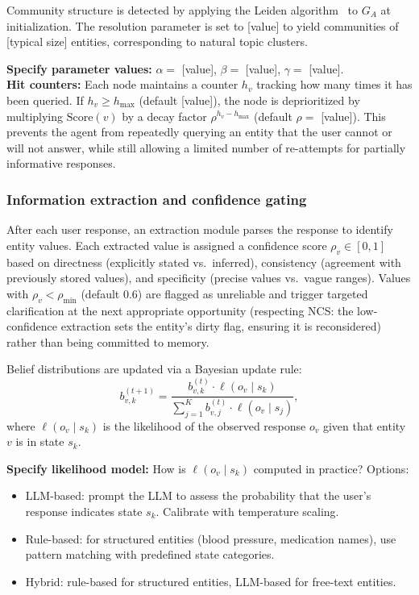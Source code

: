 \documentclass[11pt,a4paper]{article}
\newcommand{\placeholder}[1]{%
  \begin{tcolorbox}[colback=yellow!10,colframe=orange!60!black,
    fonttitle=\bfseries,title=Placeholder]
    #1
  \end{tcolorbox}%
}
\begin{document}
Community structure is detected by applying the Leiden
algorithm~\cite{traag2019leiden} to $G_A$ at initialization. The resolution
parameter is set to [value] to yield communities of [typical size] entities,
corresponding to natural topic clusters.

\placeholder{%
  \textbf{Specify parameter values:}
  $\alpha = $ [value], $\beta = $ [value], $\gamma = $ [value].\\
  \textbf{Hit counters:} Each node maintains a counter $h_v$ tracking how
  many times it has been queried. If $h_v \geq h_{\max}$ (default [value]),
  the node is deprioritized by multiplying $\mathrm{Score}(v)$ by a decay
  factor $\rho^{h_v - h_{\max}}$ (default $\rho = $ [value]). This prevents
  the agent from repeatedly querying an entity that the user cannot or will
  not answer, while still allowing a limited number of re-attempts for
  partially informative responses.
}

\subsubsection{Information extraction and confidence gating}

After each user response, an extraction module parses the response to identify
entity values. Each extracted value is assigned a confidence score
$\rho_v \in [0,1]$ based on directness (explicitly stated vs.\ inferred),
consistency (agreement with previously stored values), and specificity (precise
values vs.\ vague ranges). Values with $\rho_v < \rho_{\min}$ (default 0.6)
are flagged as unreliable and trigger targeted clarification at the next
appropriate opportunity (respecting NCS: the low-confidence extraction sets
the entity's dirty flag, ensuring it is reconsidered) rather than being
committed to memory.

Belief distributions are updated via a Bayesian update rule:
\begin{equation}
  b_{v,k}^{(t+1)} = \frac{b_{v,k}^{(t)} \cdot \ell(o_v \mid s_k)}
    {\sum_{j=1}^{K} b_{v,j}^{(t)} \cdot \ell(o_v \mid s_j)},
  \label{eq:belief_update}
\end{equation}
where $\ell(o_v \mid s_k)$ is the likelihood of the observed response $o_v$
given that entity $v$ is in state $s_k$.

\placeholder{%
  \textbf{Specify likelihood model:} How is $\ell(o_v \mid s_k)$
  computed in practice? Options:
  \begin{itemize}[noitemsep]
    \item LLM-based: prompt the LLM to assess the probability that the
          user's response indicates state $s_k$. Calibrate with
          temperature scaling.
    \item Rule-based: for structured entities (blood pressure, medication
          names), use pattern matching with predefined state categories.
    \item Hybrid: rule-based for structured entities, LLM-based for
          free-text entities.
  \end{itemize}
}
\end{document}
